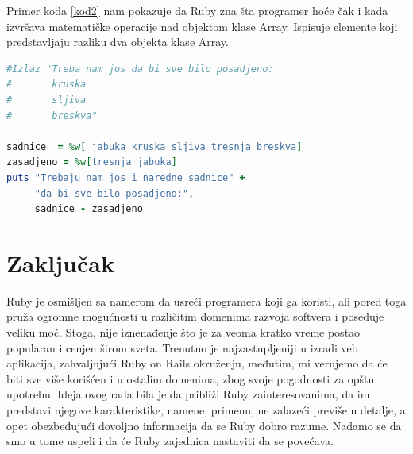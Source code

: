 \documentclass[a4paper]{article}
\begin{document}
Primer koda \ref{kod2} nam pokazuje da Ruby zna šta programer hoće čak i kada izvršava matematičke operacije nad objektom klase Array. Ispisuje elemente koji predstavljaju razliku dva objekta klase Array.
\begin{lstlisting}[language=Ruby, caption={Drugi primer koda}, frame=single, label=kod2]
#Izlaz "Treba nam jos da bi sve bilo posadjeno:
#		kruska
#		sljiva
#		breskva"

sadnice  = %w[ jabuka kruska sljiva tresnja breskva]
zasadjeno = %w[tresnja jabuka]
puts "Trebaju nam jos i naredne sadnice" +
     "da bi sve bilo posadjeno:",
     sadnice - zasadjeno
\end{lstlisting}

\section{Zaključak}
Ruby je osmišljen sa namerom da usreći programera koji ga koristi, ali pored toga pruža ogromne mogućnosti u različitim domenima razvoja softvera i poseduje veliku moć. Stoga, nije iznenađenje što je za veoma kratko vreme postao popularan i cenjen širom sveta. Trenutno je najzastupljeniji u izradi veb aplikacija, zahvaljujući Ruby on Rails okruženju, međutim, mi verujemo da će biti sve više korišćen i u ostalim domenima, zbog svoje pogodnosti za opštu upotrebu. Ideja ovog rada bila je da približi Ruby zainteresovanima, da im predstavi njegove karakteristike, namene, primenu, ne zalazeći previše u detalje, a opet obezbeđujući dovoljno informacija da se Ruby dobro razume. Nadamo se da smo u tome uspeli i da će Ruby zajednica nastaviti da se povećava.



\appendix
 

\end{document}
